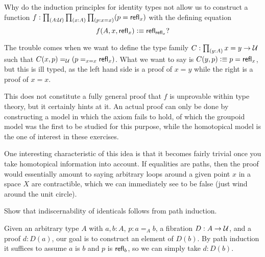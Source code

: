 \newpage

\begin{problem}
  Why do the induction principles for identity types not allow us to construct a function $f : \prd{A : \UU}{x : A}{p : x = x}(p = \refl{x})$ with the defining equation
  $$ f(A,x,\mathsf{refl}_{x}) \vcentcolon\equiv \mathsf{refl}_{\mathsf{refl}_{x}} ?$$
\end{problem}

\begin{solution}
  The trouble comes when we want to define the type family $C : \prd{y : A} x = y \to \UU$ such that $C(x,p) =_\mathcal{U} (p =_{x = x} \mathsf{refl}_{x})$.
  What we want to say is $C(y,p) \vcentcolon\equiv p = \mathsf{refl}_{x}$, but this is ill typed, as the left hand side is a proof of $x = y$ while the right is a proof of $x = x$.

  This does not constitute a fully general proof that $f$ is unprovable within type theory, but it certainly hints at it.
  An actual proof can only be done by constructing a model in which the axiom fails to hold, of which the groupoid model was the first to be studied for this purpose, while the homotopical model is the one of interest in these exercises.

  One interesting characteristic of this idea is that it becomes fairly trivial once you take homotopical information into account.
  If equalities are paths, then the proof would essentially amount to saying arbitrary loops around a given point $x$ in a space $X$ are contractible, which we can immediately see to be false (just wind around the unit circle).
\end{solution}

\begin{problem}
  Show that indiscernability of identicals follows from path induction.
\end{problem}

\begin{solution}
  Given an arbitrary type $A$ with $a,b : A$, $p : a =_A b$, a fibration $D : A \to \mathcal{U}$, and a proof $d : D(a)$, our goal is to construct an element of $D(b)$.
  By path induction it suffices to assume $a$ is $b$ and $p$ is $\mathsf{refl}_{b}$, so we can simply take $d : D(b)$.
\end{solution}

